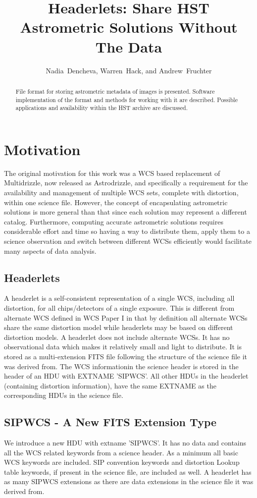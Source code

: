 \documentclass[11pt,twoside]{article}
\begin{document}
\title{Headerlets: Share HST Astrometric Solutions Without The Data}
\author{Nadia~Dencheva, Warren~Hack, and Andrew~Fruchter}

\begin{abstract}
File format for storing astrometric metadata of images is presented. 
Software implementation of the format and methods for working with 
it are described. Possible applications and availability within 
the HST archive are discussed.
\end{abstract}

\section{Motivation}
The original motivation for this work was a WCS based replacement
of Multidrizzle, now released as Astrodrizzle, and specifically a
requirement for the availability and management of multiple WCS
sets, complete with distortion,
within one science file. However, the concept of encapsulating
astrometric solutions is more general than that since each solution
may represent a different catalog. Furthermore, computing accurate
astrometric solutions requires considerable effort and time so having
a way to distribute them, apply them to a science observation and
switch between different WCSs efficiently would facilitate many
aspects of data analysis.

\subsection{Headerlets}
A headerlet is a self-consistent representation of a single WCS,
including all distortion, for all chips/detectors of a single
exposure. This is different from alternate WCS defined in WCS
Paper I \citep{greisen_2002} in that by definition
all alternate WCSs share the same distortion model while headerlets
may be based on different distortion models. A headerlet does not 
include alternate WCSs. It has no observational data
which makes it relatively small and light to distribute. 
It is stored as a multi-extension FITS file
following the structure of the science file it was derived from.
The WCS informationin the science header is stored in the header of 
an HDU with EXTNAME 'SIPWCS'. All other HDUs in the headerlet 
(containing distortion information), have the same EXTNAME as the 
corresponding HDUs in the science file.

\subsection{SIPWCS - A New FITS Extension Type}
We introduce a new HDU with extname 'SIPWCS'. It has no data and contains 
all the WCS related keywords from a science header.
As a minimum all basic WCS keywords \citep{greisen_2002} are included. SIP
convention keywords \citep{shupe_2005} and distortion Lookup table keywords, 
if present in the science file, are included as well. A headerlet has as
many SIPWCS extensions as there are data extensions in the science
file it was derived from. 
\end{document}
